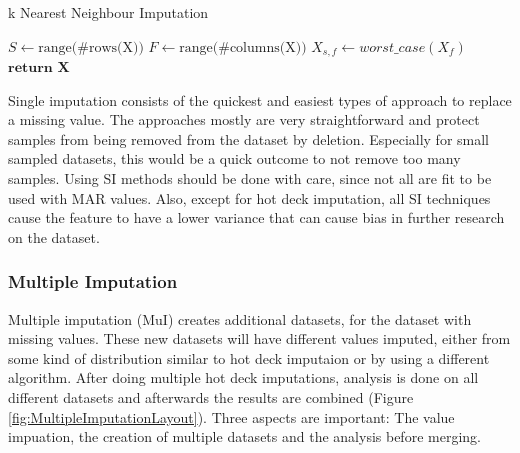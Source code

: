\documentclass[10pt,a4paper]{report}
\begin{document}
\begin{itemize}
		\begin{algorithm}[H]
			\caption{k Nearest Neighbour Imputation}\label{alg:WorstCaseImputation}
			\begin{algorithmic}[1]
				\State $S \gets \text{range(\#rows(X))}$ 	
				\State $F \gets \text{range(\#columns(X))}$ 	
				 					
				 				 			
				\State $X_{s,f} \gets \textit{worst\_case}(X_f)$	
				\EndIf
				\EndFor
				\State $\textbf{return X}$
				\EndProcedure
			\end{algorithmic}
		\end{algorithm}
		
	\end{itemize}
	
	Single imputation consists of the quickest and easiest types of approach to replace a missing value. The approaches mostly are very straightforward and protect samples from being removed from the dataset by deletion\cite{haukoos2007advanced, cartwright2003dealing}. Especially for small sampled datasets, this would be a quick outcome to not remove too many samples. Using SI methods should be done with care, since not all are fit to be used with MAR values. Also, except for hot deck imputation, all SI techniques cause the feature to have a lower variance that can cause bias in further research on the dataset\cite{donders2006gentle}. 
	
	\subsubsection{Multiple Imputation}
	\label{DEsubsec:MultipleImputation}
	
	Multiple imputation (MuI) creates additional datasets, for the dataset with missing values. These new datasets will have different values imputed, either from some kind of distribution similar to hot deck imputaion or by using a different algorithm. After doing multiple hot deck imputations, analysis is done on all different datasets and afterwards the results are combined (Figure \ref{fig:MultipleImputationLayout}). Three aspects are important: The value impuation, the creation of multiple datasets and the analysis before merging.
	
\end{document}
